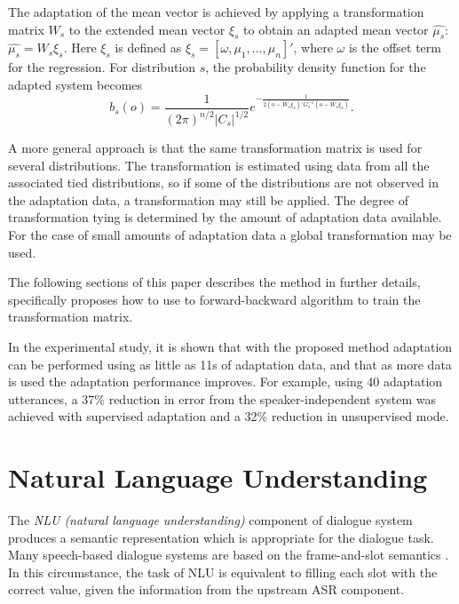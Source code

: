 \documentclass[paper=a4, fontsize=18pt]{article} %
\numberwithin{equation}{section} %
\numberwithin{figure}{section} %
\numberwithin{table}{section} %
\begin{document}
The adaptation of the mean vector is achieved by applying a transformation matrix $W_s$ to the extended mean vector $\xi_s$ to obtain an adapted mean vector $\hat{\mu_s}$: $\hat{\mu_s} = W_s \xi_s$. Here $\xi_s$ is defined as $\xi_s = [\omega, \mu_1, ..., \mu_n]'$, where $\omega$ is the offset term for the regression. For distribution $s$, the probability density function for the adapted system becomes
$$b_s(o) = \frac{1}{(2\pi)^{n/2} |C_s|^{1/2}} e^{-\frac{1}{2(o - W_s \xi_s)'G_s^{-1}(o-W_s \xi_s)}}.$$

A more general approach is that the same transformation matrix is used for several distributions. The transformation is estimated using data from all the associated tied distributions, so if some of the distributions are not observed in the adaptation data, a transformation may still be applied. The degree of transformation tying is determined by the amount of adaptation data available. For the case of small amounts of adaptation data a global transformation may be used.

The following sections of this paper describes the method in further details, specifically proposes how to use to forward-backward algorithm to train the transformation matrix.

In the experimental study, it is shown that with the proposed method adaptation can be performed using as little as 11s of adaptation data, and that as more data is used the adaptation performance improves. For example, using 40 adaptation utterances, a 37\% reduction in error from the speaker-independent system was achieved with supervised adaptation and a 32\% reduction in unsupervised mode.

\section{Natural Language Understanding}


The \emph{NLU (natural language understanding)} component of dialogue system produces a semantic representation which is appropriate for the dialogue task. Many speech-based dialogue systems are based on the frame-and-slot semantics \cite{Jurafsky2006}. In this circumstance, the task of NLU is equivalent to filling each slot with the correct value, given the information from the upstream ASR component.
\end{document}
